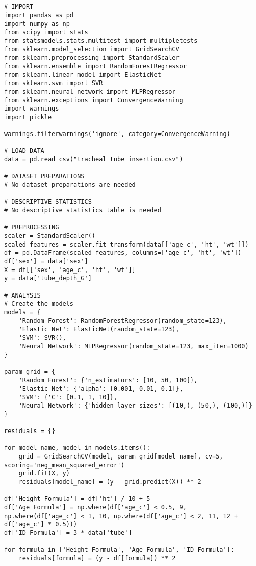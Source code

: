 \documentclass[11pt]{article}
\begin{document}
\begin{verbatim}


# IMPORT
import pandas as pd
import numpy as np
from scipy import stats
from statsmodels.stats.multitest import multipletests
from sklearn.model_selection import GridSearchCV
from sklearn.preprocessing import StandardScaler
from sklearn.ensemble import RandomForestRegressor
from sklearn.linear_model import ElasticNet
from sklearn.svm import SVR
from sklearn.neural_network import MLPRegressor
from sklearn.exceptions import ConvergenceWarning
import warnings
import pickle

warnings.filterwarnings('ignore', category=ConvergenceWarning)

# LOAD DATA
data = pd.read_csv("tracheal_tube_insertion.csv")

# DATASET PREPARATIONS
# No dataset preparations are needed

# DESCRIPTIVE STATISTICS
# No descriptive statistics table is needed

# PREPROCESSING 
scaler = StandardScaler()
scaled_features = scaler.fit_transform(data[['age_c', 'ht', 'wt']])
df = pd.DataFrame(scaled_features, columns=['age_c', 'ht', 'wt'])
df['sex'] = data['sex']
X = df[['sex', 'age_c', 'ht', 'wt']]
y = data['tube_depth_G']

# ANALYSIS 
# Create the models
models = {
    'Random Forest': RandomForestRegressor(random_state=123),
    'Elastic Net': ElasticNet(random_state=123),
    'SVM': SVR(),
    'Neural Network': MLPRegressor(random_state=123, max_iter=1000)
}

param_grid = {
    'Random Forest': {'n_estimators': [10, 50, 100]},
    'Elastic Net': {'alpha': [0.001, 0.01, 0.1]},
    'SVM': {'C': [0.1, 1, 10]},
    'Neural Network': {'hidden_layer_sizes': [(10,), (50,), (100,)]}
}

residuals = {}

for model_name, model in models.items():
    grid = GridSearchCV(model, param_grid[model_name], cv=5, scoring='neg_mean_squared_error')
    grid.fit(X, y)
    residuals[model_name] = (y - grid.predict(X)) ** 2

df['Height Formula'] = df['ht'] / 10 + 5
df['Age Formula'] = np.where(df['age_c'] < 0.5, 9, np.where(df['age_c'] < 1, 10, np.where(df['age_c'] < 2, 11, 12 + df['age_c'] * 0.5)))
df['ID Formula'] = 3 * data['tube']

for formula in ['Height Formula', 'Age Formula', 'ID Formula']:
    residuals[formula] = (y - df[formula]) ** 2


\end{verbatim}
\end{document}
